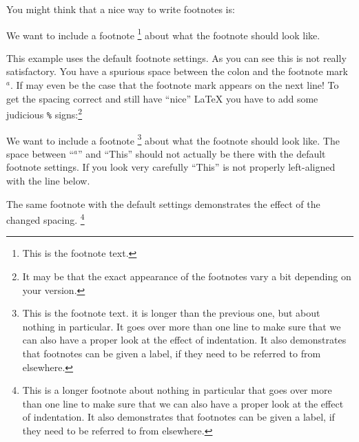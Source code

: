 You might think that a nice way to write footnotes is:
\begin{tcblisting}{}
We want to include a footnote
\footnote{
  This is the footnote text.
}
about what the footnote should look like.
\end{tcblisting}
\noindent This example uses the default footnote settings.
As you can see this is not really satisfactory. You have a spurious
space between the colon and the footnote mark \(^{a}\). If may even
be the case that the footnote mark appears on the next line! 
To get the spacing
correct and still have \enquote{nice} \LaTeX{} you have to add some
judicious \texttt{\%} signs:\footnote{%
  It may be that the exact appearance of the footnotes vary a bit
  depending on your \TeXLive version.
}
\begin{tcblisting}{}
We want to include a footnote%
\footnote{\label{foot:one}
  This is the footnote text.
  it is longer than the previous one, but about nothing in particular.
  It goes over more than one line to make sure that we can also have a proper
  look at the effect of indentation.
  It also demonstrates that footnotes can be given a label,
  if they need to be referred to from elsewhere.
}
about what the footnote should look like.
The space between \enquote{\(^{a}\)} and \enquote{This} should not actually be there
with the default footnote settings.
If you look very carefully \enquote{This} is not properly left-aligned
with the line below.
\end{tcblisting}
\begin{tcblisting}{}
The same footnote with the  default settings
demonstrates the effect of the changed spacing.%
\footnote{\label{foot:two}%
  This is a longer footnote about nothing in particular that goes
  over more than one line to make sure that we can also have a proper
  look at the effect of indentation.
  It also demonstrates that footnotes can be given a label,
  if they need to be referred to from elsewhere.
}
\end{tcblisting}

